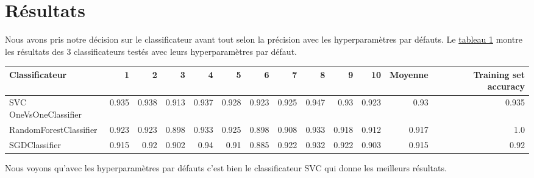 \documentclass[12pt]{extarticle}
\begin{document}
\section{Résultats}
\label{sec:org6f48b26}
Nous avons pris notre décision sur le classificateur avant tout selon la précision avec les hyperparamètres par défauts. Le \hyperref[classificators]{tableau 1} montre les résultats des 3 classificateurs testés avec leurs hyperparamètres par défaut.
\vspace{2mm}
\vspace*{-5mm}
\label{classificators}
{\scriptsize
\begin{center}
\begin{tabular}{|l|r|r|r|r|r|r|r|r|r|r|r|r|}
\hline
Classificateur & 1 & 2 & 3 & 4 & 5 & 6 & 7 & 8 & 9 & 10 & \textbf{Moyenne} & \textbf{Training set accuracy}\\
\hline
SVC OneVsOneClassifier & 0.935 & 0.938 & 0.913 & 0.937 & 0.928 & 0.923 & 0.925 & 0.947 & 0.93 & 0.923 & 0.93 & 0.935\\
\hline
RandomForestClassifier & 0.923 & 0.923 & 0.898 & 0.933 & 0.925 & 0.898 & 0.908 & 0.933 & 0.918 & 0.912 & 0.917 & 1.0\\
\hline
SGDClassifier & 0.915 & 0.92 & 0.902 & 0.94 & 0.91 & 0.885 & 0.922 & 0.932 & 0.922 & 0.903 & 0.915 & 0.92\\
\hline
\end{tabular}
\end{center}
}
\setlength\parindent{20pt}Nous voyons qu'avec les hyperparamètres par défauts c'est bien le classificateur SVC qui donne les meilleurs résultats.
\end{document}
